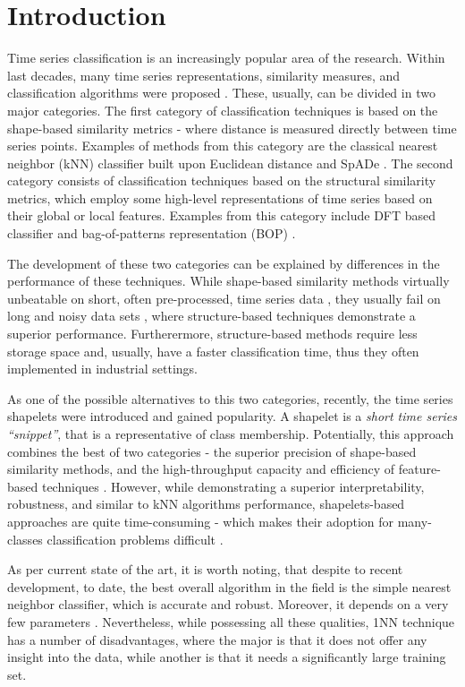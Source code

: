 \documentclass{llncs}
\begin{document}
\section{Introduction}
%
Time series classification is an increasingly popular area of the research. 
Within last decades, many time series representations, similarity measures, 
and classification algorithms were proposed \cite{review}. 
These, usually, can be divided in two major categories. 
The first category of classification techniques is based on the shape-based 
similarity metrics - where distance is measured directly between time series points. 
Examples of methods from this category are the classical nearest neighbor (kNN)
classifier built upon Euclidean distance \cite{1NN} and SpADe \cite{spade}. 
The second category consists of classification techniques based on the 
structural similarity metrics, which employ some high-level representations 
of time series based on their global or local features. 
Examples from this category include DFT based classifier \cite{DFT}
and bag-of-patterns representation (BOP) \cite{bag_patterns}. 

The development of these two categories can be explained by differences in the 
performance of these techniques. 
While shape-based similarity methods virtually unbeatable on short, 
often pre-processed, time series data \cite{benchmark}, 
they usually fail on long and noisy data sets \cite{indexing},
where structure-based techniques demonstrate a superior performance. 
Furtherermore, structure-based methods require less storage space and, usually, 
have a faster classification time, thus they often implemented in industrial settings. 

As one of the possible alternatives to this two categories, recently, the time series shapelets
were introduced \cite{shapelet} and gained popularity. A shapelet is a \textit{short time 
series ``snippet''}, that is a representative of class membership. Potentially, this 
approach combines the best of two categories - the superior precision of shape-based 
similarity methods, and the high-throughput capacity and efficiency of feature-based 
techniques \cite{logical}. 
However, while demonstrating a superior interpretability, robustness, 
and similar to kNN algorithms performance, shapelets-based approaches are quite time-consuming 
- which makes their adoption for many-classes classification problems difficult \cite{bagnal}. 

As per current state of the art, it is worth noting, that despite to recent development, to date,
the best overall algorithm in the field is the simple nearest neighbor classifier, which is 
accurate and robust. Moreover, it depends on a very few parameters 
\cite{review, benchmark, comparison, classifiers}. Nevertheless, while possessing all these qualities,
1NN technique has a number of disadvantages, where the major is that it does not offer any 
insight into the data, while another is that it needs a significantly large training set.
\end{document}
